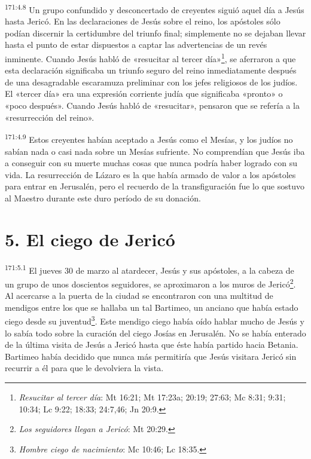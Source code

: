 \par
\textsuperscript{171:4.8} Un grupo confundido y desconcertado de creyentes siguió aquel día a Jesús hasta Jericó. En las declaraciones de Jesús sobre el reino, los apóstoles sólo podían discernir la certidumbre del triunfo final; simplemente no se dejaban llevar hasta el punto de estar dispuestos a captar las advertencias de un revés inminente. Cuando Jesús habló de «resucitar al tercer día»\footnote{\textit{Resucitar al tercer día}: Mt 16:21; Mt 17:23a; 20:19; 27:63; Mc 8:31; 9:31; 10:34; Lc 9:22; 18:33; 24:7,46; Jn 20:9.}, se aferraron a que esta declaración significaba un triunfo seguro del reino inmediatamente después de una desagradable escaramuza preliminar con los jefes religiosos de los judíos. El «tercer día» era una expresión corriente judía que significaba «pronto» o «poco después». Cuando Jesús habló de «resucitar», pensaron que se refería a la «resurrección del reino».

\par
\textsuperscript{171:4.9} Estos creyentes habían aceptado a Jesús como el Mesías, y los judíos no sabían nada o casi nada sobre un Mesías sufriente. No comprendían que Jesús iba a conseguir con su muerte muchas cosas que nunca podría haber logrado con su vida. La resurrección de Lázaro es la que había armado de valor a los apóstoles para entrar en Jerusalén, pero el recuerdo de la transfiguración fue lo que sostuvo al Maestro durante este duro período de su donación.

\section*{5. El ciego de Jericó}
\par
\textsuperscript{171:5.1} El jueves 30 de marzo al atardecer, Jesús y sus apóstoles, a la cabeza de un grupo de unos doscientos seguidores, se aproximaron a los muros de Jericó\footnote{\textit{Los seguidores llegan a Jericó}: Mt 20:29.}. Al acercarse a la puerta de la ciudad se encontraron con una multitud de mendigos entre los que se hallaba un tal Bartimeo, un anciano que había estado ciego desde su juventud\footnote{\textit{Hombre ciego de nacimiento}: Mc 10:46; Lc 18:35.}. Este mendigo ciego había oído hablar mucho de Jesús y lo sabía todo sobre la curación del ciego Josías en Jerusalén. No se había enterado de la última visita de Jesús a Jericó hasta que éste había partido hacia Betania. Bartimeo había decidido que nunca más permitiría que Jesús visitara Jericó sin recurrir a él para que le devolviera la vista.

